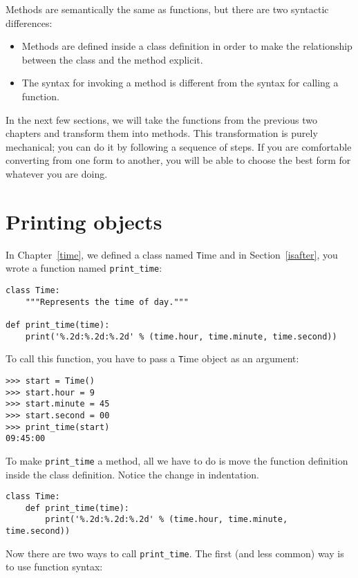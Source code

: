 \documentclass[
DIV=11,
fontsize=13,
twoside,
headinclude=false,
titlepage=firstiscover,
abstract=true,
headsepline=true,
footsepline=true,
chapterprefix=true, %
headings=big,
bibliography=totoc,%
captions=tableheading
]{scrbook}
\theoremstyle{definition}
\begin{document}
Methods are semantically the same as functions, but there are
two syntactic differences:

\begin{itemize}

\item Methods are defined inside a class definition in order
to make the relationship between the class and the method explicit.

\item The syntax for invoking a method is different from the
syntax for calling a function.

\end{itemize}

In the next few sections, we will take the functions from the previous
two chapters and transform them into methods.  This transformation is
purely mechanical; you can do it by following a sequence of
steps.  If you are comfortable converting from one form to another,
you will be able to choose the best form for whatever you are doing.


\section{Printing objects}

In Chapter~\ref{time}, we defined a class named
{\texttt Time} and in Section~\ref{isafter}, you 
wrote a function named \verb"print_time":

\begin{lstlisting}
class Time:
    """Represents the time of day."""

def print_time(time):
    print('%.2d:%.2d:%.2d' % (time.hour, time.minute, time.second))
\end{lstlisting}
%
To call this function, you have to pass a {\texttt Time} object as an
argument:

\begin{lstlisting}
>>> start = Time()
>>> start.hour = 9
>>> start.minute = 45
>>> start.second = 00
>>> print_time(start)
09:45:00
\end{lstlisting}
%
To make \verb"print_time" a method, all we have to do is
move the function definition inside the class definition.  Notice
the change in indentation.

\begin{lstlisting}
class Time:
    def print_time(time):
        print('%.2d:%.2d:%.2d' % (time.hour, time.minute, time.second))
\end{lstlisting}
%
Now there are two ways to call \verb"print_time".  The first
(and less common) way is to use function syntax:
\end{document}
